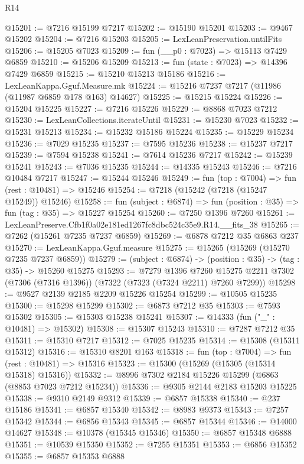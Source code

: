 \begin{lexlean}{R14}
\begin{coremodule}
@15201 := @7216 @15199 @7217
@15202 := @15190 @15201
@15203 := @9467 @15202
@15204 := @7216 @15203
@15205 := LexLeanPreservation.untilFits
@15206 := @15205 @7023
@15209 := fun (__p0 : @7023) => @15113 @7429 @6859
@15210 := @15206 @15209
@15213 := fun (state : @7023) => @14396 @7429 @6859
@15215 := @15210 @15213 @15186
@15216 := LexLeanKappa.Gguf.Measure.mk
@15224 := @15216 @7237 @7217 (@11986 (@11987 @6859 @178 @163) @14627)
@15225 := @15215 @15224
@15226 := @15204 @15225
@15227 := @7216 @15226
@15229 := @8868 @7023 @7212
@15230 := LexLeanCollections.iterateUntil
@15231 := @15230 @7023
@15232 := @15231 @15213
@15234 := @15232 @15186 @15224
@15235 := @15229 @15234
@15236 := @7029 @15235
@15237 := @7595 @15236
@15238 := @15237 @7217
@15239 := @7594 @15238
@15241 := @7614 @15236 @7217
@15242 := @15239 @15241
@15243 := @7036 @15235
@15244 := @14335 @15243
@15246 := @7216 @10484 @7217
@15247 := @15244 @15246
@15249 := fun (top : @7004) => fun (rest : @10481) => @15246
@15254 := @7218 (@15242 (@7218 (@15247 @15249)) @15246)
@15258 := fun (subject : @6874) => fun (position : @35) => fun (tag : @35) => @15227 @15254
@15260 := @7250 @1396 @7260
@15261 := LexLeanPreserve.Cfb1f0a02e181ed1267fc8dbc524c35e9.R14.__fits_38
@15265 := @7262 (@15261 @7235 @7237 @6859)
@15269 := @6878 @7212 @35 @6863 @237
@15270 := LexLeanKappa.Gguf.measure
@15275 := @15265 (@15269 (@15270 @7235 @7237 @6859))
@15279 := (subject : @6874) -> (position : @35) -> (tag : @35) -> @15260 @15275
@15293 := @7279
    @1396
    @7260
    @15275
    @2211
    @7302
    (@7306 (@7316 @1396))
    (@7322 (@7323 (@7324 @2211) @7260 @7299))
@15298 := @9527 @2139 @2185 @2209 @15226 @15254
@15299 := @10505 @15235
@15300 := @15298 @15299
@15302 := @6873 @7212 @35
@15303 := @7593 @15302
@15305 := @15303 @15238 @15241
@15307 := @14333 (fun ("_" : @10481) => @15302)
@15308 := @15307 @15243
@15310 := @7287 @7212 @35
@15311 := @15310 @7217
@15312 := @7025 @15235
@15314 := @15308 (@15311 @15312)
@15316 := @15310 @8201 @163
@15318 := fun (top : @7004) => fun (rest : @10481) => @15316
@15323 := @15300 (@15269 (@15305 (@15314 @15318) @15316))
@15332 := @8996 @7302 @2184 @15226 @15299 (@6863 (@8853 @7023 @7212 @15234))
@15336 := @9305 @2144 @2183 @15203 @15225
@15338 := @9310 @2149 @9312
@15339 := @6857 @15338
@15340 := @237 @15186
@15341 := @6857 @15340
@15342 := @8983 @9373
@15343 := @7257 @15342
@15344 := @6856 @15343
@15345 := @6857 @15344
@15346 := @14000 @14627
@15348 := @10378 (@15345 @15346)
@15350 := @6857 @15348 @6888
@15351 := @10539 @15350
@15352 := @7255 @15351
@15353 := @6856 @15352
@15355 := @6857 @15353 @6888

\end{coremodule}
\end{lexlean}
